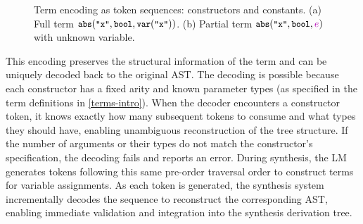 \documentclass[manuscript,screen]{acmart}
\newcommand{\sk}[1]{\textcolor{skunknown}{#1}}
\newcommand{\tcode}[1]{{\small \texttt{\spaceskip=0.2em #1}}}
\begin{document}
\begin{figure}[tb]
\centering
{}

\setlength{\fboxsep}{1pt}
\caption{Term encoding as token sequences: 
\colorbox{blue!15}{\textsf{constructors}} and 
\colorbox{blue!8}{\textsf{constants}}.
(a) Full term $\tcode{abs}(\tcode{"x"}, \tcode{bool}, \tcode{var}(\tcode{"x"}))$.
(b) Partial term $\tcode{abs}(\tcode{"x"}, \tcode{bool}, \sk{e})$ with unknown variable.}
\label{fig:term-encoding}
\end{figure}

This encoding preserves the structural information of the term and can be uniquely decoded back to the original AST. The decoding is possible because each constructor has a fixed arity and known parameter types (as specified in the term definitions in \autoref{terms-intro}). When the decoder encounters a constructor token, it knows exactly how many subsequent tokens to consume and what types they should have, enabling unambiguous reconstruction of the tree structure. If the number of arguments or their types do not match the constructor's specification, the decoding fails and reports an error. During synthesis, the LM generates tokens following this same pre-order traversal order to construct terms for variable assignments. As each token is generated, the synthesis system incrementally decodes the sequence to reconstruct the corresponding AST, enabling immediate validation and integration into the synthesis derivation tree.
\end{document}
